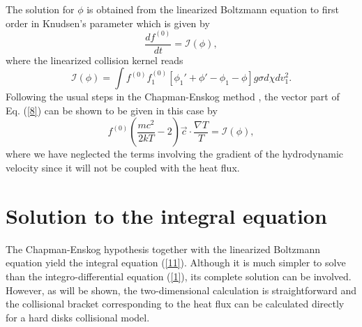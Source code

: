 \documentclass[11pt]{article} %
\begin{document}
The solution for $\phi$ is obtained from the linearized Boltzmann
equation to first order in Knudsen's parameter which is given by \cite{Ch-E}
\begin{equation}
\frac{df^{\left(0\right)}}{dt}=\mathcal{I}\left(\phi\right),\label{8}
\end{equation}
where the linearized collision kernel reads 
\begin{equation}
\mathcal{I}\left(\phi\right)=\int f^{\left(0\right)}f_{1}^{\left(0\right)}\left[\phi_{1}'+\phi'-\phi_{1}-\phi\right]g\sigma d\chi dv_{1}^{2}.\label{9}
\end{equation}
Following the usual steps in the Chapman-Enskog method \cite{Ch-E},
the vector part of Eq. (\ref{8}) can be shown to be given in this
case by 
\begin{equation}
f^{\left(0\right)}\left(\frac{mc^{2}}{2kT}-2\right)\vec{c}\cdot\frac{\nabla T}{T}=\mathcal{I}\left(\phi\right),\label{11}
\end{equation}
where we have neglected the terms involving the gradient of the hydrodynamic
velocity since it will not be coupled with the heat flux. 


\section{Solution to the integral equation}

The Chapman-Enskog hypothesis together with the linearized Boltzmann
equation yield the integral equation (\ref{11}). Although
it is much simpler to solve than the integro-differential equation
 (\ref{1}), its complete solution can be involved. However,
as will be shown, the two-dimensional calculation is straightforward
and the collisional bracket corresponding to the heat flux can be
calculated directly for a hard disks collisional model.
\end{document}
